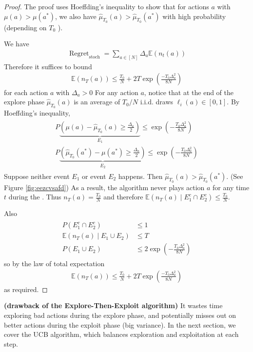 \documentclass{article}
\newcommand{\bfs}[1]{\textbf{({#1}) }}
\begin{document}
\begin{proof}
The proof uses Hoeffding's inequality to show that for actions $a$ with $\mu(a)>\mu\left(a^{*}\right)$, we also have $\hat{\mu}_{T_{0}}(a)>\hat{\mu}_{T_{0}}\left(a^{*}\right)$ with high probability (depending on $T_{0}$ ).

We have
\begin{align*}
\operatorname{ Regret }_{\mathrm{stoch }}=\sum_{a \in[N]} \Delta_{a} \mathbb{E}\left(n_{t}(a)\right)
\end{align*}
Therefore it suffices to bound
\begin{align*}
\mathbb{E}\left(n_{T}(a)\right) \leq \frac{T_{0}}{N}+2 T \exp \left(\frac{-T_{0} \Delta_{a}^{2}}{8 N}\right)
\end{align*}
for each action $a$ with $\Delta_{a}>0$
For any action $a$, notice that at the end of the explore phase $\hat{\mu}_{T_{0}}(a)$ is an average of $T_{0} / N$ i.i.d. draws $\ell_{i}(a) \in[0,1] .$ By Hoeffding's inequality,
\begin{align*}
\begin{gathered}
P \underbrace{\left(\mu(a)-\hat{\mu}_{T_{0}}(a) \geq \frac{\Delta_{a}}{2}\right)}_{E_{1}} \leq \exp \left(-\frac{T_{0} \Delta_{a}^{2}}{8 N}\right) \\
P \underbrace{\left(\hat{\mu}_{T_{0}}\left(a^{*}\right)-\mu\left(a^{*}\right) \geq \frac{\Delta_{a}}{2}\right)}_{E_{2}} \leq \exp \left(-\frac{T_{0} \Delta_{a}^{2}}{8 N}\right)
\end{gathered}
\end{align*}
Suppose neither event $E_{1}$ or event $E_{2}$ happens. Then $\hat{\mu}_{T_{0}}(a)>\hat{\mu}_{T_{0}}\left(a^{*}\right) .$ (See Figure
\cref{fig:eezcvsafd}) As a result, the algorithm never plays action $a$ for any time $t$ during the . Thus $n_{T}(a)=\frac{T_{0}}{N}$ and therefore $\mathbb{E}\left(n_{T}(a) \mid E_{1}^{c} \cap E_{2}^{c}\right) \leq \frac{T_{0}}{N}$.

Also
\begin{align*}
\begin{aligned}
P\left(E_{1}^{c} \cap E_{2}^{c}\right) & \leq 1 \\
\mathbb{E}\left(n_{T}(a) \mid E_{1} \cup E_{2}\right) & \leq T \\
P\left(E_{1} \cup E_{2}\right) & \leq 2 \exp \left(-\frac{T_{0} \Delta_{a}^{2}}{8 N}\right)
\end{aligned}
\end{align*}
so by the law of total expectation
\begin{align*}
\mathbb{E}\left(n_{T}(a)\right) \leq \frac{T_{0}}{N}+2 T \exp \left(\frac{-T_{0} \Delta_{a}^{2}}{8 N}\right)
\end{align*}
as required.
\end{proof}
\begin{rema}\bfs{drawback of the Explore-Then-Exploit algorithm}
  It wastes time exploring bad actions during the explore phase, and potentially misses out on better actions during the exploit phase (big variance). In the next section, we cover the UCB algorithm, which balances exploration and exploitation at each step.
\end{rema}
\end{document}
